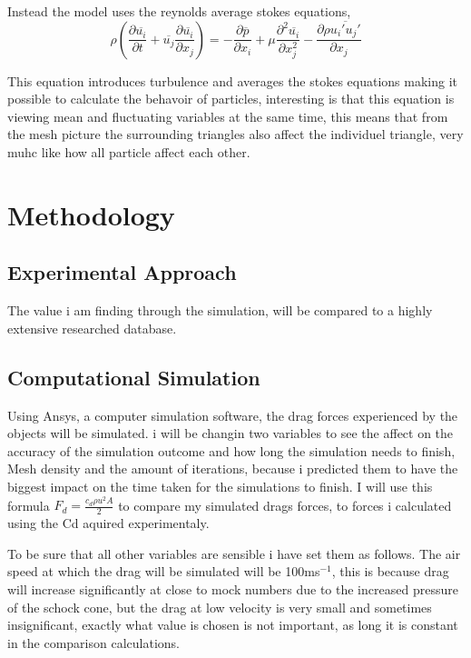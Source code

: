\documentclass[12pt,a4paper]{article}
\begin{document}
Instead the model uses the reynolds average stokes equations,
\begin{equation}
\rho\left(\frac{\partial \overline{u_i}}{\partial t} + \overline{u_j}\frac{\partial \overline{u_i}}{\partial x_j}\right) = -\frac{\partial \overline{p}}{\partial x_i} + \mu\frac{\partial^2 \overline{u_i}}{\partial x_j^2} - \frac{\partial \rho\overline{u_i' u_j'}}{\partial x_j}
\end{equation}

This equation introduces turbulence and averages the stokes equations making it possible to calculate the behavoir of particles, interesting is that this equation is viewing mean and fluctuating variables at the same time, this means that from the mesh picture the surrounding triangles also affect the individuel triangle, very muhc like how all particle affect each other.

\section{Methodology}

\subsection{Experimental Approach}

The value i am finding through the simulation, will be compared to a highly extensive researched database.

\subsection{Computational Simulation}

Using Ansys, a computer simulation software, the drag forces experienced by the objects will be simulated. i will be changin two variables to see the affect on the accuracy of the simulation outcome and how long the simulation needs to finish, Mesh density and the amount of iterations, because i predicted them to have the biggest impact on the time taken for the simulations to finish. I will use this formula $F_d = \frac{c_d \rho u^2 A}{2}$ to compare my simulated drags forces, to forces i calculated using the Cd aquired experimentaly. 

To be sure that all other variables are sensible i have set them as follows. The air speed at which the drag will be simulated will be 100ms$^{-1}$, this is because drag will increase significantly at close to mock numbers due to the increased pressure of the schock cone, but the drag at low velocity is very small and sometimes insignificant, exactly what value is chosen is not important, as long it is constant in the comparison calculations. 
\end{document}
